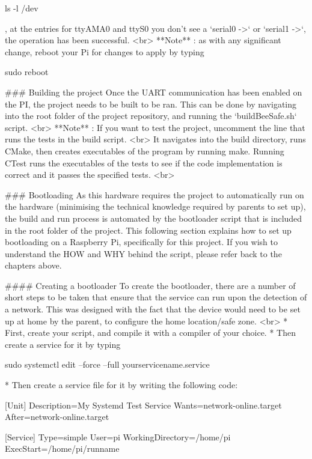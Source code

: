  ls -\/l /dev 
\begin{DoxyCode}
, at the entries for ttyAMA0 and ttyS0 you don't see a `serial0 ->` or `serial1 ->`, the operation has been
       successful.
<br>
**Note** : as with any significant change, reboot your Pi for changes to apply by typing
\end{DoxyCode}
 sudo reboot 
\begin{DoxyCode}
### Building the project
Once the UART communication has been enabled on the PI, the project needs to be built to be ran. This can
       be done by navigating into the root folder of the project repository, and running the `buildBeeSafe.sh`
       script.
<br>
**Note** : If you want to test the project, uncomment the line that runs the tests in the build script.
<br>
It navigates into the build directory, runs CMake, then creates executables of the program by running make.
       Running CTest runs the executables of the tests to see if the code implementation is correct and it passes
       the specified tests.
<br>

### Bootloading
As this hardware requires the project to automatically run on the hardware (minimising the technical
       knowledge required by parents to set up), the build and run process is automated by the bootloader script that is
       included in the root folder of the project. This following section explains how to set up bootloading on a
       Raspberry Pi, specifically for this project. If you wish to understand the HOW and WHY behind the script,
       please refer back to the chapters above.

#### Creating a bootloader
To create the bootloader, there are a number of short steps to be taken that ensure that the service can
       run upon the detection of a network. This was designed with the fact that the device would need to be set up
       at home by the parent, to configure the home location/safe zone.
<br>
* First, create your script, and compile it with a compiler of your choice.
* Then create a service for it by typing
\end{DoxyCode}
 sudo systemctl edit --force --full yourservicename.\+service 
\begin{DoxyCode}
* 
Then create a service file for it by writing the following code:
\end{DoxyCode}
 \mbox{[}Unit\mbox{]} Description=My Systemd Test Service Wants=network-\/online.\+target After=network-\/online.\+target

\mbox{[}Service\mbox{]} Type=simple User=pi Working\+Directory=/home/pi Exec\+Start=/home/pi/runname

